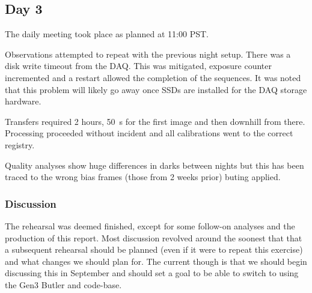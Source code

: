 \subsection{Day 3} \label{sec:day3}

The daily meeting took place as planned at 11:00 PST.

Observations attempted to repeat with the previous night setup.  There was a
disk write timeout from the DAQ.  This was mitigated, exposure counter incremented
and a restart allowed the completion of the sequences.  It was noted that this 
problem will likely go away once SSDs are installed for the DAQ storage hardware.

Transfers required 2 hours, 50~s for the first image and then downhill from there.
Processing proceeded without incident and all calibrations went to the correct
registry.

Quality analyses show huge differences in darks between nights but this has been
traced to the wrong bias frames (those from 2 weeks prior) buting applied.

\subsubsection{Discussion}

The rehearsal was deemed finished, except for some follow-on analyses and 
the production of this report.  Most discussion revolved around the soonest that
that a subsequent rehearsal should be planned (even if it were to repeat this
exercise) and what changes we should plan for.  The current though is that we
should begin discussing this in September and should set a goal to be able to
switch to using the Gen3 Butler and code-base.



